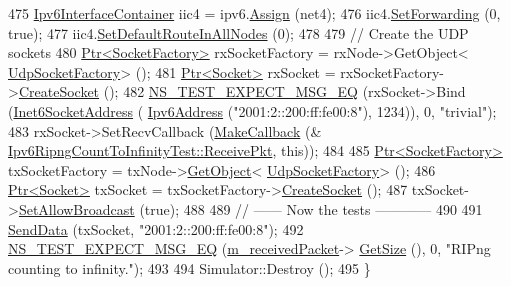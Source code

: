 \begin{DoxyCode}
475   \hyperlink{classns3_1_1Ipv6InterfaceContainer}{Ipv6InterfaceContainer} iic4 = ipv6.\hyperlink{classns3_1_1Ipv6AddressHelper_aad4685588aea1757beaf881bc4157912}{Assign} (net4);
476   iic4.\hyperlink{classns3_1_1Ipv6InterfaceContainer_a080aad6f43a52c6478053b237e5e6979}{SetForwarding} (0, \textcolor{keyword}{true});
477   iic4.\hyperlink{classns3_1_1Ipv6InterfaceContainer_a3fb0cfdcb3780bc624b10a04e58ffbd0}{SetDefaultRouteInAllNodes} (0);
478 
479   \textcolor{comment}{// Create the UDP sockets}
480   \hyperlink{classns3_1_1Ptr}{Ptr<SocketFactory>} rxSocketFactory = rxNode->GetObject<
      \hyperlink{classns3_1_1UdpSocketFactory}{UdpSocketFactory}> ();
481   \hyperlink{classns3_1_1Ptr}{Ptr<Socket>} rxSocket = rxSocketFactory->\hyperlink{classns3_1_1SocketFactory_a97351e6e7860503a4912042530449f62}{CreateSocket} ();
482   \hyperlink{group__testing_ga7304ba46a28d8cf08dfdfd6499cf7068}{NS\_TEST\_EXPECT\_MSG\_EQ} (rxSocket->Bind (\hyperlink{classns3_1_1Inet6SocketAddress}{Inet6SocketAddress} (
      \hyperlink{classns3_1_1Ipv6Address}{Ipv6Address} (\textcolor{stringliteral}{"2001:2::200:ff:fe00:8"}), 1234)), 0, \textcolor{stringliteral}{"trivial"});
483   rxSocket->SetRecvCallback (\hyperlink{group__makecallbackmemptr_ga9376283685aa99d204048d6a4b7610a4}{MakeCallback} (&
      \hyperlink{classIpv6RipngCountToInfinityTest_ad11ef9b746354ff86cd7ffd12e144a12}{Ipv6RipngCountToInfinityTest::ReceivePkt}, \textcolor{keyword}{this}));
484 
485   \hyperlink{classns3_1_1Ptr}{Ptr<SocketFactory>} txSocketFactory = txNode->\hyperlink{classns3_1_1Object_a13e18c00017096c8381eb651d5bd0783}{GetObject}<
      \hyperlink{classns3_1_1UdpSocketFactory}{UdpSocketFactory}> ();
486   \hyperlink{classns3_1_1Ptr}{Ptr<Socket>} txSocket = txSocketFactory->\hyperlink{classns3_1_1SocketFactory_a97351e6e7860503a4912042530449f62}{CreateSocket} ();
487   txSocket->\hyperlink{classns3_1_1Socket_a32b4fa27b732a63207c8d9054a817ed5}{SetAllowBroadcast} (\textcolor{keyword}{true});
488 
489   \textcolor{comment}{// ------ Now the tests ------------}
490 
491   \hyperlink{classIpv6RipngCountToInfinityTest_a6669f1fe087ad5e126a0929da2e72320}{SendData} (txSocket, \textcolor{stringliteral}{"2001:2::200:ff:fe00:8"});
492   \hyperlink{group__testing_ga7304ba46a28d8cf08dfdfd6499cf7068}{NS\_TEST\_EXPECT\_MSG\_EQ} (\hyperlink{classIpv6RipngCountToInfinityTest_ae1c66254eaebe5e4ce52c7c03fa2166a}{m\_receivedPacket}->
      \hyperlink{classns3_1_1Packet_a462855c9929954d4301a4edfe55f4f1c}{GetSize} (), 0, \textcolor{stringliteral}{"RIPng counting to infinity."});
493 
494   Simulator::Destroy ();
495 \}
\end{DoxyCode}


